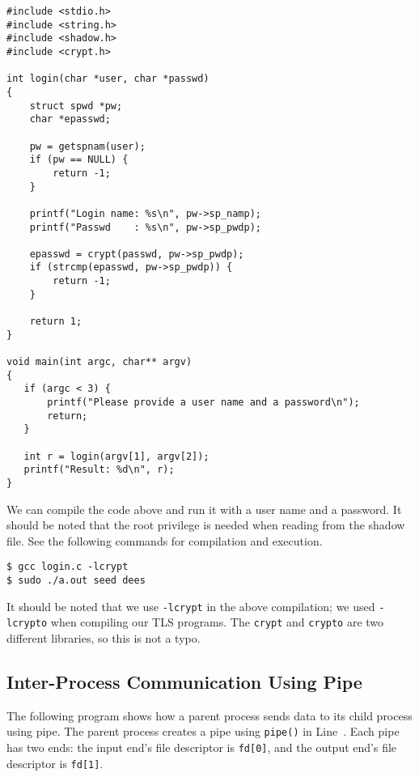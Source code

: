 \begin{lstlisting}
#include <stdio.h>
#include <string.h>
#include <shadow.h>
#include <crypt.h>

int login(char *user, char *passwd)
{
    struct spwd *pw;
    char *epasswd;

    pw = getspnam(user);
    if (pw == NULL) {
        return -1;
    }

    printf("Login name: %s\n", pw->sp_namp);
    printf("Passwd    : %s\n", pw->sp_pwdp);

    epasswd = crypt(passwd, pw->sp_pwdp);
    if (strcmp(epasswd, pw->sp_pwdp)) {
        return -1;
    }

    return 1;
}

void main(int argc, char** argv)
{
   if (argc < 3) {
       printf("Please provide a user name and a password\n");
       return;
   }

   int r = login(argv[1], argv[2]);
   printf("Result: %d\n", r);
}
\end{lstlisting}


We can compile the code above and run it with a user name and a password. 
It should be noted that the root privilege is needed when reading from the 
shadow file. See the following commands for compilation and execution.

\begin{lstlisting}
$ gcc login.c -lcrypt
$ sudo ./a.out seed dees
\end{lstlisting}
 
It should be noted that we use \texttt{-lcrypt} in the above compilation;
we used \texttt{-lcrypto} when compiling our TLS programs. The
\texttt{crypt} and \texttt{crypto} are two different libraries, so this is
not a typo.


\vspace{0.2in}
\subsection{Inter-Process Communication Using Pipe}
\label{vpn:subsec:pipe}

The following program shows how a parent process sends data to its child process using 
pipe. The parent process creates a pipe using \texttt{pipe()} in Line~. 
Each pipe has two ends: the input end's file descriptor is \texttt{fd[0]}, and 
the output end's file descriptor is \texttt{fd[1]}. 

